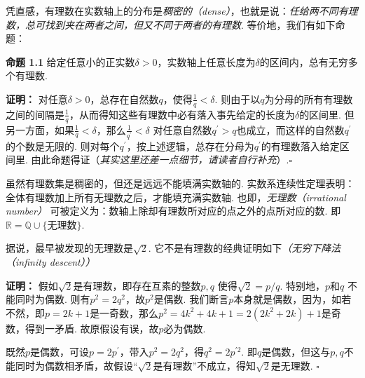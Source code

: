 \documentclass{article}
\begin{document}
凭直感，有理数在实数轴上的分布是\textit{稠密的（dense）}，也就是说：\textit{任给两不同有理数，总可找到夹在两者之间，但又不同于两者的有理数}. 等价地，我们有如下命题：

\vspace{3pt}

\textbf{命题 1.1} 给定任意小的正实数$\delta>0$，实数轴上任意长度为$\delta$的区间内，总有无穷多个有理数.

\vspace{3pt}

\textbf{证明：} 对任意$\delta>0$，总存在自然数$q$，使得$\frac{1}{q}<\delta$. 则由于以$q$为分母的所有有理数之间的间隔是$\frac{1}{q}$，从而得知这些有理数中必有落入事先给定的长度为$\delta$的区间里. 但另一方面，如果$\frac{1}{q}<\delta$，那么$\frac{1}{q^{\prime}}<\delta$ 对任意自然数$q^{\prime}>q$也成立，而这样的自然数$q^{\prime}$的个数是无限的. 则对每个$q^{\prime}$，按上述逻辑，总存在分母为$q^{\prime}$的有理数落入给定区间里. 由此命题得证（\textit{其实这里还差一点细节，请读者自行补充}）.\qquad $\square$

\vspace{4pt}

虽然有理数集是稠密的，但还是远远不能填满实数轴的. 实数系连续性定理表明：全体有理数加上所有无理数之后，才能填充满实数轴. 也即，\textit{无理数（irrational number）} 可被定义为：数轴上除却有理数所对应的点之外的点所对应的数. 即$\mathbb{R}=\mathbb{Q}\cup\{\textit{无理数}\}$.

\vspace{4pt}

据说，最早被发现的无理数是$\sqrt{2}$. 它不是有理数的经典证明如下\textit{（无穷下降法（infinity descent））}

\vspace{3pt}

\textbf{证明：} 假如$\sqrt{2}$是有理数，即存在互素的整数$p,q$ 使得$\sqrt{2}=p/q$. 特别地，$p$和$q$ 不能同时为偶数. 则有$p^{2}=2q^{2}$，故$p^{2}$是偶数. 我们断言$p$本身就是偶数，因为，如若不然，即$p=2k+1$是一奇数，那么$p^{2}=4k^{2}+4k+1=2(2k^{2}+2k)+1$是奇数，得到一矛盾. 故原假设有误，故$p$必为偶数. 

\vspace{3pt}

既然$p$是偶数，可设$p=2p^{\prime}$，带入$p^{2}=2q^{2}$，得$q^{2}=2p^{\prime 2}$. 即$q$是偶数，但这与$p,q$不能同时为偶数相矛盾，故假设“$\sqrt{2}$是有理数”不成立，得知$\sqrt{2}$是无理数. \quad$\square$
\end{document}
